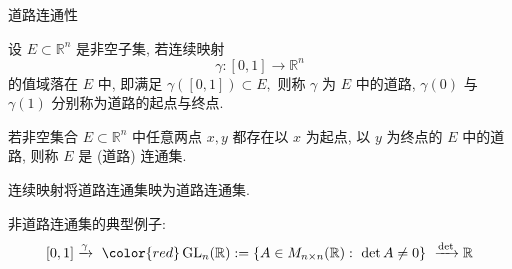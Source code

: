 
\begin{frame}{道路连通性}

\begin{Def}[道路连通集]
设 $E \subset \mathbb{R}^n$ 是非空子集, 若连续映射
\[\gamma: [0, 1] \longrightarrow \mathbb{R}^n\]
的值域落在 $E$ 中, 即满足 $\gamma([0, 1]) \subset E,$ 则称 $\gamma$ 为 $E$ 中的道路, $\gamma(0)$ 与 $\gamma(1)$ 分别称为道路的起点与终点.

\pause
\vspace{0.5em}

若非空集合 $E \subset \mathbb{R}^n$ 中任意两点 $x, y$ 都存在以 $x$ 为起点, 以 $y$ 为终点的 $E$ 中的道路, 则称 $E$ 是 (道路) 连通集.
\end{Def}

\pause

\begin{thm}
连续映射将道路连通集映为道路连通集.
\end{thm}

\pause

非道路连通集的典型例子:
\[[0, 1] \xrightarrow{\gamma} ~ {\color{red} \operatorname{GL}_n(\mathbb{R}) := \{A \in M_{n\times n}(\mathbb{R}): ~ \det A \neq 0\} } ~ \xrightarrow{\det} \mathbb{R}\]

\end{frame}



